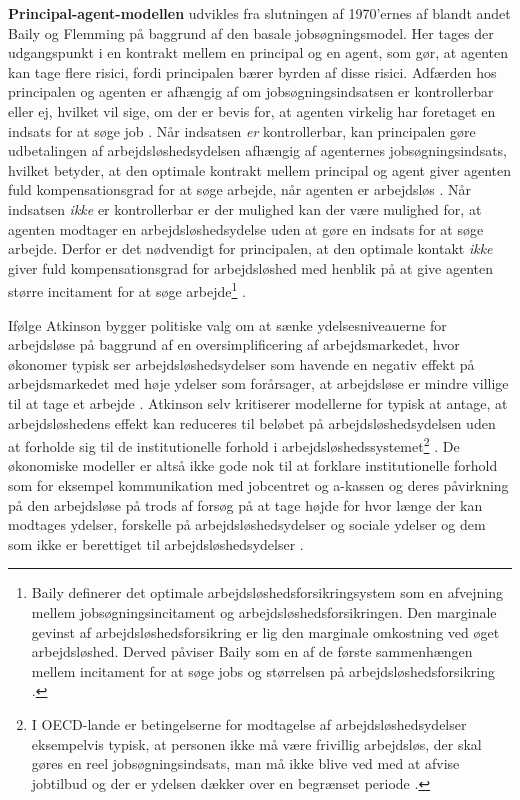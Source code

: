 \textbf{Principal-agent-modellen} udvikles fra slutningen af 1970'ernes af blandt andet Baily og Flemming på baggrund af den basale jobsøgningsmodel. Her tages der udgangspunkt i en kontrakt mellem en principal og en agent, som gør, at agenten kan tage flere risici, fordi principalen bærer byrden af disse risici. Adfærden hos principalen og agenten er afhængig af om jobsøgningsindsatsen er kontrollerbar eller ej, hvilket vil sige, om der er bevis for, at agenten virkelig har foretaget en indsats for at søge job \parencite[134]{Cahuc2004}. Når indsatsen \textit{er} kontrollerbar, kan principalen gøre udbetalingen af arbejdsløshedsydelsen afhængig af agenternes jobsøgningsindsats, hvilket betyder, at den optimale kontrakt mellem principal og agent giver agenten fuld kompensationsgrad for at søge arbejde, når agenten er arbejdsløs \parencite[138]{Cahuc2004}. Når indsatsen \textit{ikke} er kontrollerbar er der mulighed kan der være mulighed for, at agenten modtager en arbejdsløshedsydelse uden at gøre en indsats for at søge arbejde. Derfor er det nødvendigt for principalen, at den optimale kontakt \textit{ikke} giver fuld kompensationsgrad for arbejdsløshed med henblik på at give agenten større incitament for at søge arbejde\footnote{Baily definerer det optimale arbejdsløshedsforsikringsystem som en afvejning mellem jobsøgningsincitament og arbejdsløshedsforsikringen.
Den marginale gevinst af arbejdsløshedsforsikring er lig den marginale omkostning ved øget arbejdsløshed. Derved påviser Baily som en af de første sammenhængen mellem incitament for at søge jobs og størrelsen på arbejdsløshedsforsikring \parencite[379]{Baily1978}.} \parencite[379]{Baily1978}. %

Ifølge Atkinson bygger politiske valg om at sænke ydelsesniveauerne for arbejdsløse på baggrund af en oversimplificering af arbejdsmarkedet, hvor økonomer typisk ser arbejdsløshedsydelser som havende en negativ effekt på arbejdsmarkedet med høje ydelser som forårsager, at arbejdsløse er mindre villige til at tage et arbejde \parencite[1680]{Atkinson1991}. Atkinson selv kritiserer modellerne for typisk at antage, at arbejdsløshedens effekt kan reduceres til beløbet på arbejdsløshedsydelsen uden at forholde sig til de institutionelle forhold i arbejdsløshedssystemet\footnote{I OECD-lande er betingelserne for modtagelse af arbejdsløshedsydelser eksempelvis typisk, at personen ikke må være frivillig arbejdsløs, der skal gøres en reel jobsøgningsindsats, man må ikke blive ved med at afvise jobtilbud og der er ydelsen dækker over en begrænset periode \parencite[1689]{Atkinson1991}.} \parencite[1688]{Atkinson1991}. De økonomiske modeller er altså ikke gode nok til at forklare institutionelle forhold som for eksempel kommunikation med jobcentret og a-kassen og deres påvirkning på den arbejdsløse på trods af forsøg på at tage højde for hvor længe der kan modtages ydelser, forskelle på arbejdsløshedsydelser og sociale ydelser og dem som ikke er berettiget til arbejdsløshedsydelser \parencite[1692]{Atkinson1991} \parencite[33-34]{Halvorsen1999} \parencite[114]{Cahuc2004}.

